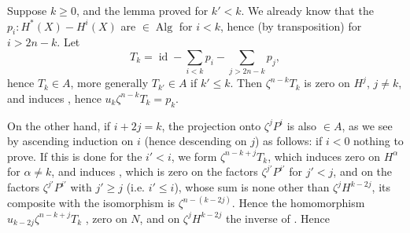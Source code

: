 
Suppose $k\geq0$, and the lemma proved for $k'<k$. We already know that the $p_i:H^*(X)\mathbin{-}H^i(X)$ are $\in\operatorname{Alg}$ for $i<k$, hence (by transposition) for $i>2n-k$. Let
\[
T_k=\operatorname{id}-\sum_{i<k}p_i-\sum_{j>2n-k}p_j,
\]
hence $T_k\in A$, more generally $T_{k'}\in A$ if $k'\leq k$. Then $\zeta^{n-k}T_k$ is zero on $H^j$, $j\neq k$, and induces
, hence $u_k\zeta^{n-k}T_k=p_k$.

On the other hand, if $i+2j=k$,  the projection onto $\zeta^jP^i$ is also $\in A$, as we see  by ascending induction on $i$ (hence descending on $j$) as follows: if $i<0$ nothing to prove. If this is done for the $i'<i$, we form $\zeta^{n-k+j}T_k$, \deleted{$\unsure{\zeta}$} which induces zero on $H^\alpha$ for $\alpha\neq k$, and induces
, which is zero  on the factors $\zeta^{j'}P^{i'}$ for $j'<j$,  and on the factors $\zeta^{j'}P^{i'}$ with $j'\geq j$ (i.e. $i'\leq i$),  whose sum is none other than $\zeta^jH^{k-2j}$, its composite with the isomorphism
is $\zeta^{n-(k-2j)}$. Hence the homomorphism $u_{k-2j}\zeta^{n-k+j}T_k$ , zero on $N$, and on $\zeta^jH^{k-2j}$ the inverse of
. Hence

